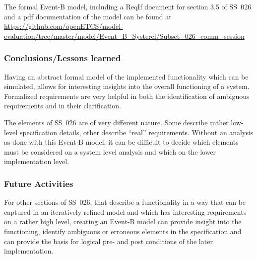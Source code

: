 The formal Event-B model, including a ReqIf document for section 3.5 of SS~026
and a pdf documentation of the model can be found at
\url{https://github.com/openETCS/model-evaluation/tree/master/model/Event_B_Systerel/Subset_026_comm_session}

\subsubsection{Conclusions/Lessons learned}

Having an abstract formal model of the implemented functionality which can be
simulated, allows for interesting insights into the overall functioning of a
system. Formalized requirements are very helpful in both the identification of
ambiguous requirements and in their clarification.

The elements of SS~026 are of very different nature. Some describe rather
low-level specification details, other describe ``real'' requirements. Without
an analysis as done with this Event-B model, it can be difficult to decide which
elements must be considered on a system level analysis and which on the lower
implementation level.


\subsubsection{Future Activities}
\label{sec:future-activities}

For other sections of SS~026, that describe a functionality in a way that can be
captured in an iteratively refined model and which has interesting requirements
on a rather high level, creating an Event-B model can provide insight into the
functioning, identify ambiguous or erroneous elements in the specification and
can provide the basis for logical pre- and post conditions of the later
implementation.

